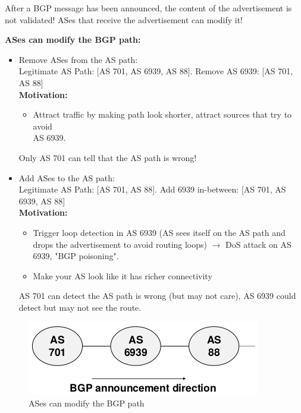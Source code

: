 \documentclass[11pt,oneside,a4paper]{article}
\begin{document}
After a BGP message has been announced, the content of the advertisement is not validated! ASes that receive the advertisement can modify it!

\textbf{ASes can modify the BGP path:}

\vspace{-\topsep}
\begin{itemize}
	\setlength{\itemsep}{0pt}
	\setlength{\parskip}{0pt}
	\item Remove ASes from the AS path:\\
	Legitimate AS Path: [AS 701, AS 6939, AS 88]. Remove AS 6939: [AS 701, AS 88]\\
	\textbf{Motivation:}
	\vspace{-\topsep}
	\begin{itemize}
		\item 	Attract traffic by making path look shorter, attract sources that try to avoid\\
		AS 6939.
	\end{itemize}
	Only AS 701 can tell that the AS path is wrong!
	\item Add ASes to the AS path:\\
	Legitimate AS Path: [AS 701, AS 88]. Add 6939 in-between: [AS 701, AS 6939, AS 88]\\
	\textbf{Motivation:}
	\vspace{-\topsep}
	\begin{itemize} 
		\item Trigger loop detection in AS 6939 (AS sees itself on the AS path and drops the advertisement to avoid routing loops) $\rightarrow$ DoS attack on AS 6939, "BGP poisoning".
		\item Make your AS look like it has richer connectivity
	\end{itemize}
	AS 701 can detect the AS path is wrong (but may not care), AS 6939 could detect but may not see the route.
\end{itemize}
\vspace{-\topsep}

\begin{figure}
	\centering
	\includegraphics[width=0.4\linewidth]{figures/bgp_as_path}
	\caption{ASes can modify the BGP path}
	\label{fig:bgpaspath}
\end{figure}
\end{document}
